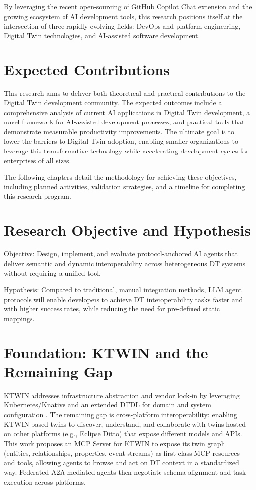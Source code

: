 By leveraging the recent open-sourcing of GitHub Copilot Chat extension and the growing ecosystem of AI development tools, this research positions itself at the intersection of three rapidly evolving fields: DevOps and platform engineering, Digital Twin technologies, and AI-assisted software development.

\section{Expected Contributions}

This research aims to deliver both theoretical and practical contributions to the Digital Twin development community. The expected outcomes include a comprehensive analysis of current AI applications in Digital Twin development, a novel framework for AI-assisted development processes, and practical tools that demonstrate measurable productivity improvements. The ultimate goal is to lower the barriers to Digital Twin adoption, enabling smaller organizations to leverage this transformative technology while accelerating development cycles for enterprises of all sizes.

The following chapters detail the methodology for achieving these objectives, including planned activities, validation strategies, and a timeline for completing this research program.






\section{Research Objective and Hypothesis}

Objective: Design, implement, and evaluate protocol-anchored AI agents that deliver semantic and dynamic interoperability across heterogeneous DT systems without requiring a unified tool.

Hypothesis: Compared to traditional, manual integration methods, LLM agent protocols will enable developers to achieve DT interoperability tasks faster and with higher success rates, while reducing the need for pre-defined static mappings.

\section{Foundation: KTWIN and the Remaining Gap}

KTWIN addresses infrastructure abstraction and vendor lock-in by leveraging Kubernetes/Knative and an extended DTDL for domain and system configuration \cite{ktwin}. The remaining gap is cross-platform interoperability: enabling KTWIN-based twins to discover, understand, and collaborate with twins hosted on other platforms (e.g., Eclipse Ditto) that expose different models and APIs. This work proposes an MCP Server for KTWIN to expose its twin graph (entities, relationships, properties, event streams) as first-class MCP resources and tools, allowing agents to browse and act on DT context in a standardized way. Federated A2A-mediated agents then negotiate schema alignment and task execution across platforms.

